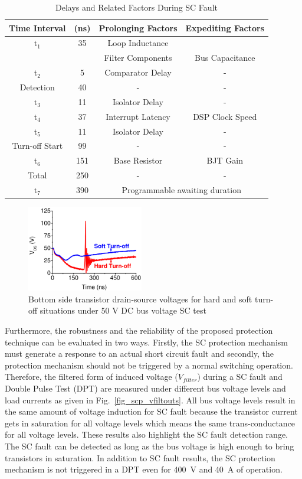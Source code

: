 \documentclass[journal]{IEEEtran}
\begin{document}
\begin{table}[!t]
\renewcommand{\arraystretch}{1.3}
\caption{Delays and Related Factors During SC Fault}
\label{table_delay}
\centering
\begin{tabular}{|c||c||c||c|}
\hline
Time Interval & (ns) & Prolonging Factors & Expediting Factors\\
\hline
t$_1$ & 35 & Loop Inductance & \\
&  & Filter Components & Bus Capacitance\\
\hline
t$_2$ & 5 & Comparator Delay & -\\
\hline
\rowcolor{Gray}
Detection & 40 & -  & -\\
\hline
t$_3$ & 11 & Isolator Delay & -\\
\hline
t$_4$ & 37 & Interrupt Latency & DSP Clock Speed\\
\hline
t$_5$ & 11 & Isolator Delay & -\\
\hline
\rowcolor{Gray}
Turn-off Start & 99 & -  & -\\
\hline
t$_6$ & 151 & Base Resistor & BJT Gain\\
\hline
\rowcolor{Gray}
Total & 250 & - & -\\
\hline
t$_7$ & 390 &\multicolumn{2}{c|}{Programmable awaiting duration}\\
\hline
\end{tabular}
\end{table}

\begin{figure}[]
\centering
\includegraphics[width=2in]{Figures/Fig13-STOvsHTO.pdf}
\caption{Bottom side transistor drain-source voltages for hard and soft turn-off situations under 50 V DC bus voltage SC test}
\label{fig_hstoff}
\end{figure}

Furthermore, the robustness and the reliability of the proposed protection technique can be evaluated in two ways. Firstly, the SC protection mechanism must generate a response to an actual short circuit fault and secondly, the protection mechanism should not be triggered by a normal switching operation. Therefore, the filtered form of induced voltage ($V_{filter}$) during a SC fault and Double Pulse Test (DPT) are measured under different bus voltage levels and load currents as given in Fig.~\ref{fig_scp_vfiltouts}. All bus voltage levels result in the same amount of voltage induction for SC fault because the transistor current gets in saturation for all voltage levels which means the same trans-conductance for all voltage levels. These results also highlight the SC fault detection range. The SC fault can be detected as long as the bus voltage is high enough to bring transistors in saturation. In addition to SC fault results, the SC protection mechanism is not triggered in a DPT even for 400~V and 40~A of operation.
\end{document}
